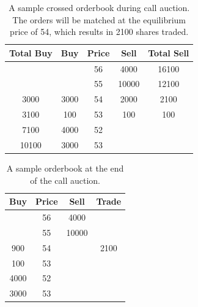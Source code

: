\begin{table}[]
  \centering
  \begin{tabular}{c|c|c|c|c}
    \hline
    \textbf{Total Buy} & \textbf{Buy} & \textbf{Price} & \textbf{Sell} & \textbf{Total Sell} \\ \hline
                       &              & 56             & 4000          & 16100               \\ \hline
                       &              & 55             & 10000         & 12100               \\ \hline
    3000               & 3000         & 54             & 2000          & 2100                \\ \hline
    3100               & 100          & 53             & 100           & 100                 \\ \hline
    7100               & 4000         & 52             &               &                     \\ \hline
    10100              & 3000         & 53             &               &                     \\ \hline
  \end{tabular}

  \caption{A sample crossed orderbook during call auction. The orders will be matched at the equilibrium price of 54, which results in 2100 shares traded.}
  \label{itayoseTable1}
\end{table}


\begin{table}[]
  \centering
  \begin{tabular}{c|c|c|c}
    \hline
    \textbf{Buy} & \textbf{Price} & \textbf{Sell} & \textbf{Trade} \\ \hline
                 & 56             & 4000          &                \\ \hline
                 & 55             & 10000         &                \\ \hline
    900          & 54             &               & 2100           \\ \hline
    100          & 53             &               &                \\ \hline
    4000         & 52             &               &                \\ \hline
    3000         & 53             &               &                \\ \hline
  \end{tabular}
  \caption{A sample orderbook at the end of the call auction.}
  \label{itayoseTable2}
\end{table}

